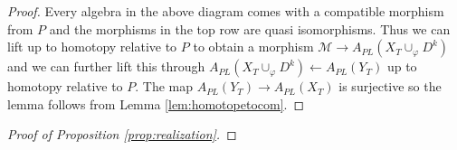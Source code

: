 \documentclass[12pt,a4paper]{article}
\theoremstyle{definition}
\begin{document}
\begin{proof}
Every algebra in the above diagram comes with a compatible morphism from $P$ and the morphisms in the top row are quasi isomorphisms. Thus we can lift up to homotopy relative to $P$ to obtain a morphism $\mathcal{M}\rightarrow A_{PL}(X_T\cup_\varphi D^k)$ and we can further lift this  through $A_{PL}(X_T\cup_\varphi D^k)\leftarrow A_{PL}(Y_T)$ up to homotopy relative to $P$. The map $A_{PL}(Y_T)\rightarrow A_{PL}(X_T)$ is surjective so the lemma follows from Lemma \ref{lem:homotopetocom}.
\end{proof}


\begin{proof}[Proof of Proposition \ref{prop:realization}]




\end{proof}
\end{document}
